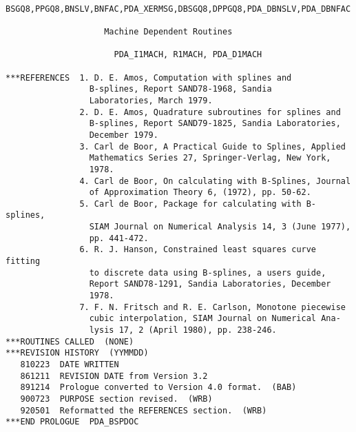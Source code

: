 \begin{verbatim}
       BSGQ8,PPGQ8,BNSLV,BNFAC,PDA_XERMSG,DBSGQ8,DPPGQ8,PDA_DBNSLV,PDA_DBNFAC

                    Machine Dependent Routines

                      PDA_I1MACH, R1MACH, PDA_D1MACH

***REFERENCES  1. D. E. Amos, Computation with splines and
                 B-splines, Report SAND78-1968, Sandia
                 Laboratories, March 1979.
               2. D. E. Amos, Quadrature subroutines for splines and
                 B-splines, Report SAND79-1825, Sandia Laboratories,
                 December 1979.
               3. Carl de Boor, A Practical Guide to Splines, Applied
                 Mathematics Series 27, Springer-Verlag, New York,
                 1978.
               4. Carl de Boor, On calculating with B-Splines, Journal
                 of Approximation Theory 6, (1972), pp. 50-62.
               5. Carl de Boor, Package for calculating with B-splines,
                 SIAM Journal on Numerical Analysis 14, 3 (June 1977),
                 pp. 441-472.
               6. R. J. Hanson, Constrained least squares curve fitting
                 to discrete data using B-splines, a users guide,
                 Report SAND78-1291, Sandia Laboratories, December
                 1978.
               7. F. N. Fritsch and R. E. Carlson, Monotone piecewise
                 cubic interpolation, SIAM Journal on Numerical Ana-
                 lysis 17, 2 (April 1980), pp. 238-246.
***ROUTINES CALLED  (NONE)
***REVISION HISTORY  (YYMMDD)
   810223  DATE WRITTEN
   861211  REVISION DATE from Version 3.2
   891214  Prologue converted to Version 4.0 format.  (BAB)
   900723  PURPOSE section revised.  (WRB)
   920501  Reformatted the REFERENCES section.  (WRB)
***END PROLOGUE  PDA_BSPDOC
\end{verbatim}


